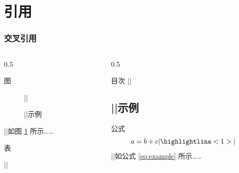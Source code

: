 
\section{引用}

\begin{frame}[fragile]
  \frametitle{交叉引用}


  \begin{columns}
    \begin{column}{0.5\textwidth}
      \begin{codeblock}[]{图}
\begin{figure}
||  \caption{|\phantom{}|示例}\label{fig:example}
\end{figure}
||如图 \ref{fig:example} 所示……
      \end{codeblock}
      \begin{codeblock}[]{表}
\begin{table}
||  \caption{|\phantom{}|示例}\label{tab:example}
\end{table}
      \end{codeblock}
    \end{column}
    \begin{column}{0.5\textwidth}
\begin{codeblock}[]{目次}
||\section{|\phantom{}|示例}\label{sec:example}
\end{codeblock}

\begin{codeblock}[]{公式}
\begin{equation}
  a = b + c
|\highlightline<1>|\label{eq:example}
\end{equation}
||如公式 \eqref{eq:example} 所示……
\end{codeblock}
    \end{column}
  \end{columns}
\end{frame}

